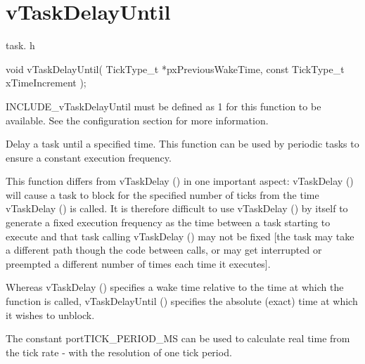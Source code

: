 \hypertarget{group__v_task_delay_until}{}\section{v\+Task\+Delay\+Until}
\label{group__v_task_delay_until}
task. h 
\begin{DoxyPre}void vTaskDelayUntil( TickType\_t *pxPreviousWakeTime, const TickType\_t xTimeIncrement );\end{DoxyPre}


I\+N\+C\+L\+U\+D\+E\+\_\+v\+Task\+Delay\+Until must be defined as 1 for this function to be available. See the configuration section for more information.

Delay a task until a specified time. This function can be used by periodic tasks to ensure a constant execution frequency.

This function differs from v\+Task\+Delay () in one important aspect\+: v\+Task\+Delay () will cause a task to block for the specified number of ticks from the time v\+Task\+Delay () is called. It is therefore difficult to use v\+Task\+Delay () by itself to generate a fixed execution frequency as the time between a task starting to execute and that task calling v\+Task\+Delay () may not be fixed \mbox{[}the task may take a different path though the code between calls, or may get interrupted or preempted a different number of times each time it executes\mbox{]}.

Whereas v\+Task\+Delay () specifies a wake time relative to the time at which the function is called, v\+Task\+Delay\+Until () specifies the absolute (exact) time at which it wishes to unblock.

The constant port\+T\+I\+C\+K\+\_\+\+P\+E\+R\+I\+O\+D\+\_\+\+M\+S can be used to calculate real time from the tick rate -\/ with the resolution of one tick period.


